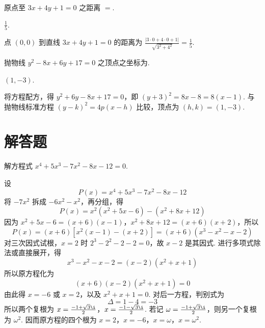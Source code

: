 \documentclass[UTF8,a4paper,oneside,11pt]{ctexbook}
\begin{document}
\begin{problem}
原点至 \(3x + 4y + 1 = 0\) 之距离 \(=\)\fillinblank{}.
\end{problem}

\begin{answer}
\(\frac{1}{5}\).
\end{answer}

\begin{solution}
点 \((0,0)\) 到直线 \(3x+4y+1=0\) 的距离为 \(\frac{|3\cdot0+4\cdot0+1|}{\sqrt{3^{2}+4^{2}}}=\frac{1}{5}\).
\end{solution}

\begin{problem}
抛物线 \(y^{2} - 8x + 6y + 17 = 0\) 之顶点之坐标为\fillinblank{}.
\end{problem}

\begin{answer}
\(\left( 1,-3 \right)\).
\end{answer}

\begin{solution}
将方程配方，得 \(y^{2}+6y-8x+17=0\)，即 \((y+3)^{2}=8x-8=8(x-1)\). 与抛物线标准方程 \((y-k)^{2}=4p(x-h)\) 比较，顶点为 \((h,k)=(1,-3)\).
\end{solution}

\section{解答题}


\begin{problem}
解方程式 \(x^{4} + 5x^{3} - 7x^{2} - 8x - 12 = 0\).
\end{problem}

\begin{solution}
设
\[
P(x)=x^{4}+5x^{3}-7x^{2}-8x-12
\]
将 \(-7x^{2}\) 拆成 \(-6x^{2}-x^{2}\)，再分组，得
\[
P(x)=x^{2}\left(x^{2}+5x-6\right)-\left(x^{2}+8x+12\right)
\]
因为 \(x^{2}+5x-6=(x+6)(x-1)\)，\(x^{2}+8x+12=(x+6)(x+2)\)，所以
\[
P(x)=(x+6)\left[x^{2}(x-1)-(x+2)\right]
=(x+6)\left(x^{3}-x^{2}-x-2\right)
\]
对三次因式试根，\(x=2\) 时 \(2^{3}-2^{2}-2-2=0\)，故 \(x-2\) 是其因式. 进行多项式除法或直接展开，得
\[
x^{3}-x^{2}-x-2=(x-2)\left(x^{2}+x+1\right)
\]
所以原方程化为
\[
(x+6)(x-2)(x^{2}+x+1)=0
\]
由此得 \(x=-6\) 或 \(x=2\)，以及 \(x^{2}+x+1=0\). 对后一方程，判别式为
\[
\Delta=1-4=-3
\]
所以两个复根为
\(x=\frac{-1+\sqrt{3}\i}{2}\)，\(x=\frac{-1-\sqrt{3}\i}{2}\).
若记 \(\omega=\frac{-1+\sqrt{3}\i}{2}\)，则另一个复根为 \(\omega^{2}\). 因而原方程的四个根为
\(x=2\)，\(x=-6\)，\(x=\omega\)，\(x=\omega^{2}\).
\end{solution}
\end{document}
